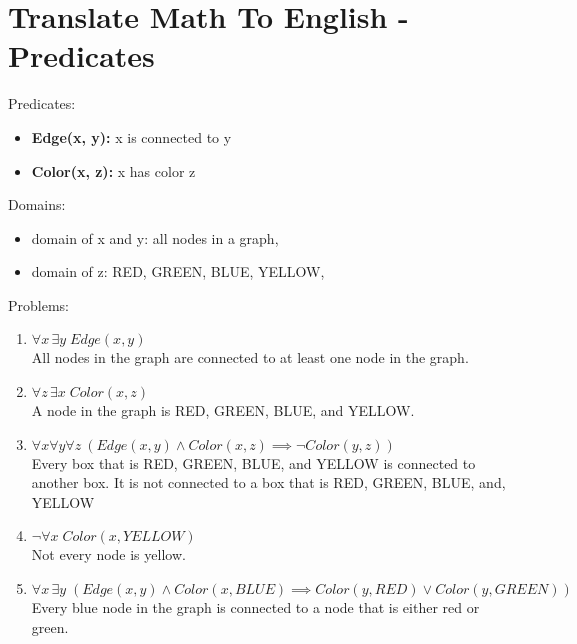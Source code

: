 \documentclass[a4paper]{article}
\begin{document}
\bigskip %

\section{Translate Math To English - Predicates}
\large Predicates:
\normalsize
\begin{itemize}
    \item \textbf{Edge(x, y):} x is connected to y
    \item \textbf{Color(x, z):} x has color z
\end{itemize}
\large Domains:
\normalsize
\begin{itemize}
    \item domain of x and y: {all nodes in a graph},
    \item domain of z: {RED, GREEN, BLUE, YELLOW},
\end{itemize}
\large Problems:
\normalsize
\boldmath
\begin{enumerate}
    \item $\forall x \, \exists y \; Edge(x, y)$ \\
    All nodes in the graph are connected to at least one node in the graph.
    \item $\forall z \, \exists x \; Color(x, z)$ \\
    A node in the graph is RED, GREEN, BLUE, and YELLOW.
    \item $\forall x \forall y \forall z \: (Edge(x, y) \land Color(x, z) \implies \neg Color(y, z))$ \\
    Every box that is RED, GREEN, BLUE, and YELLOW is connected to another box. It is not connected to a box that is RED, GREEN, BLUE, and, YELLOW
    \item $\neg \forall x \; Color(x, YELLOW)$ \\
    Not every node is yellow.
    \item $\forall x \, \exists y \; (Edge(x, y) \land Color(x, BLUE) \implies Color(y, RED) \lor Color(y, GREEN))$ \\
    Every blue node in the graph is connected to a node that is either red or green.
\end{enumerate}
\unboldmath

\bigskip %
\end{document}
